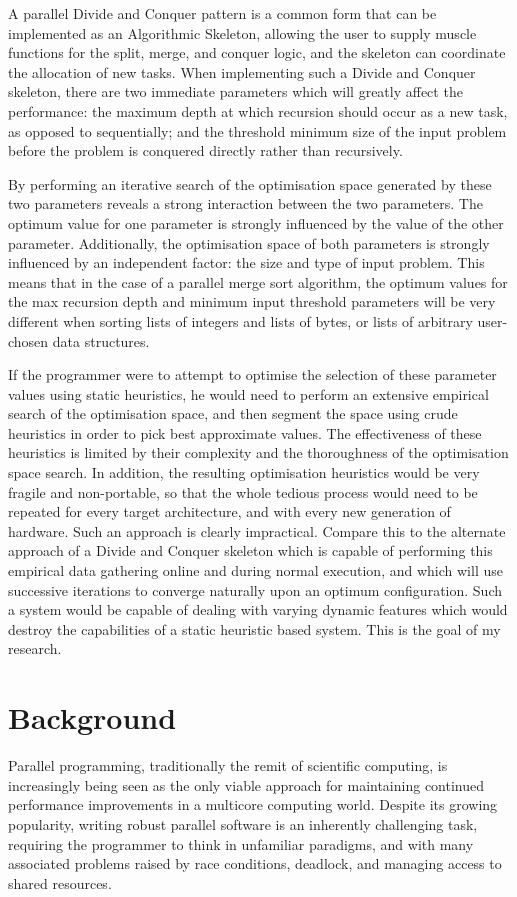 A parallel Divide and Conquer pattern is a common form that can be
implemented as an Algorithmic Skeleton, allowing the user to supply
muscle functions for the split, merge, and conquer logic, and the
skeleton can coordinate the allocation of new tasks. When implementing
such a Divide and Conquer skeleton, there are two immediate parameters
which will greatly affect the performance: the maximum depth at which
recursion should occur as a new task, as opposed to sequentially; and
the threshold minimum size of the input problem before the problem is
conquered directly rather than recursively.

By performing an iterative search of the optimisation space generated
by these two parameters reveals a strong interaction between the two
parameters. The optimum value for one parameter is strongly influenced
by the value of the other parameter. Additionally, the optimisation
space of both parameters is strongly influenced by an independent
factor: the size and type of input problem. This means that in the
case of a parallel merge sort algorithm, the optimum values for the
max recursion depth and minimum input threshold parameters will be
very different when sorting lists of integers and lists of bytes, or
lists of arbitrary user-chosen data structures.

If the programmer were to attempt to optimise the selection of these
parameter values using static heuristics, he would need to perform an
extensive empirical search of the optimisation space, and then segment
the space using crude heuristics in order to pick best approximate
values. The effectiveness of these heuristics is limited by their
complexity and the thoroughness of the optimisation space search. In
addition, the resulting optimisation heuristics would be very fragile
and non-portable, so that the whole tedious process would need to be
repeated for every target architecture, and with every new generation
of hardware. Such an approach is clearly impractical. Compare this to
the alternate approach of a Divide and Conquer skeleton which is
capable of performing this empirical data gathering online and during
normal execution, and which will use successive iterations to converge
naturally upon an optimum configuration. Such a system would be
capable of dealing with varying dynamic features which would destroy
the capabilities of a static heuristic based system. This is the goal
of my research.

\section*{Background}
Parallel programming, traditionally the remit of scientific computing,
is increasingly being seen as the only viable approach for maintaining
continued performance improvements in a multicore computing world.
Despite its growing popularity, writing robust parallel software is an
inherently challenging task, requiring the programmer to think in
unfamiliar paradigms, and with many associated problems raised by race
conditions, deadlock, and managing access to shared resources.

